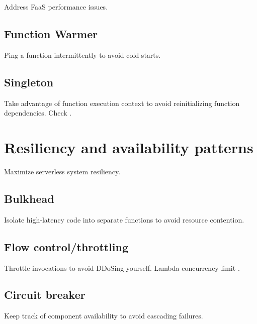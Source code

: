 Address FaaS performance issues.

\subsection{Function Warmer} \label{subsec:FunctionWarmer}

Ping a function intermittently to avoid cold starts.



\subsection{Singleton} \label{subsec:Singleton}

Take advantage of function execution context to avoid reinitializing function dependencies. Check \textcite{aws18serverlessLens}.

\section{Resiliency and availability patterns} \label{sec:resiliencyPatterns}

Maximize serverless system resiliency.

\subsection{Bulkhead} \label{subsec:Bulkhead}

Isolate high-latency code into separate functions to avoid resource contention.

\subsection{Flow control/throttling} \label{subsec:Flow control/throttling}

Throttle invocations to avoid DDoSing yourself. Lambda concurrency limit \textcite{aws18serverlessLens}.

\subsection{Circuit breaker} \label{subsec:Circuit breaker}

Keep track of component availability to avoid cascading failures.

